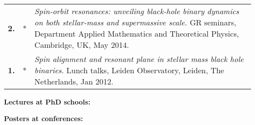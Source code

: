 {\begin{longtable}{rp{0.3cm}p{15.8cm}}
%
\textbf{2.} & * & \textit{Spin-orbit resonances: unveiling black-hole binary dynamics on both stellar-mass and supermassive scale.}
\newline{}
GR seminars, Department Applied Mathematics and Theoretical Physics, Cambridge, UK,  May 2014.
\vspace{0.05cm}\\
%
\textbf{1.} & * & \textit{Spin alignment and resonant plane in stellar mass black hole binaries.}
\newline{}
Lunch talks, Leiden Observatory, Leiden, The Netherlands, Jan 2012.
\vspace{0.05cm}\\
%
\end{longtable} }
\textcolor{color1}{\textbf{Lectures at PhD schools:}}
\vspace{-0.5cm}

\textcolor{color1}{\textbf{Posters at conferences:}}
\vspace{-0.5cm}


